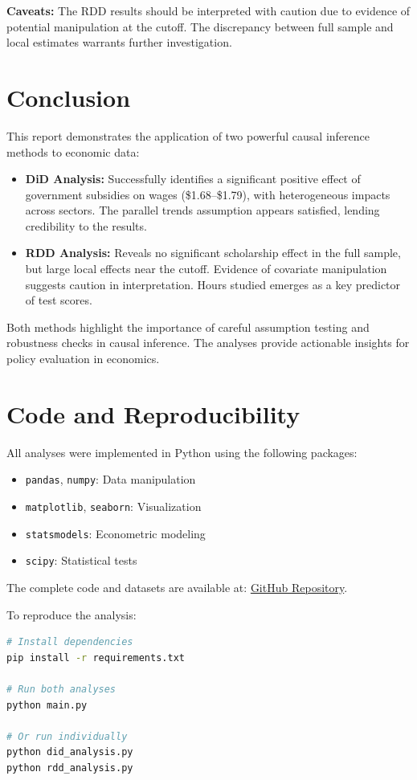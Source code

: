 \documentclass[a4paper,12pt,headsepline]{scrartcl} %
\begin{document}
\textbf{Caveats:}
The RDD results should be interpreted with caution due to evidence of potential manipulation at the cutoff. The discrepancy between full sample and local estimates warrants further investigation.

\section{Conclusion}

This report demonstrates the application of two powerful causal inference methods to economic data:

\begin{itemize}
    \item \textbf{DiD Analysis:} Successfully identifies a significant positive effect of government subsidies on wages (\$1.68--\$1.79), with heterogeneous impacts across sectors. The parallel trends assumption appears satisfied, lending credibility to the results.
    
    \item \textbf{RDD Analysis:} Reveals no significant scholarship effect in the full sample, but large local effects near the cutoff. Evidence of covariate manipulation suggests caution in interpretation. Hours studied emerges as a key predictor of test scores.
\end{itemize}

Both methods highlight the importance of careful assumption testing and robustness checks in causal inference. The analyses provide actionable insights for policy evaluation in economics.

\section{Code and Reproducibility}

All analyses were implemented in Python using the following packages:
\begin{itemize}
    \item \texttt{pandas}, \texttt{numpy}: Data manipulation
    \item \texttt{matplotlib}, \texttt{seaborn}: Visualization
    \item \texttt{statsmodels}: Econometric modeling
    \item \texttt{scipy}: Statistical tests
\end{itemize}

The complete code and datasets are available at: \href{https://github.com/introspective321/Sem_7_assignments}{\color{HyperlinkBlue}GitHub Repository}.

To reproduce the analysis:
\begin{lstlisting}[language=bash]
# Install dependencies
pip install -r requirements.txt

# Run both analyses
python main.py

# Or run individually
python did_analysis.py
python rdd_analysis.py
\end{lstlisting}
\end{document}

